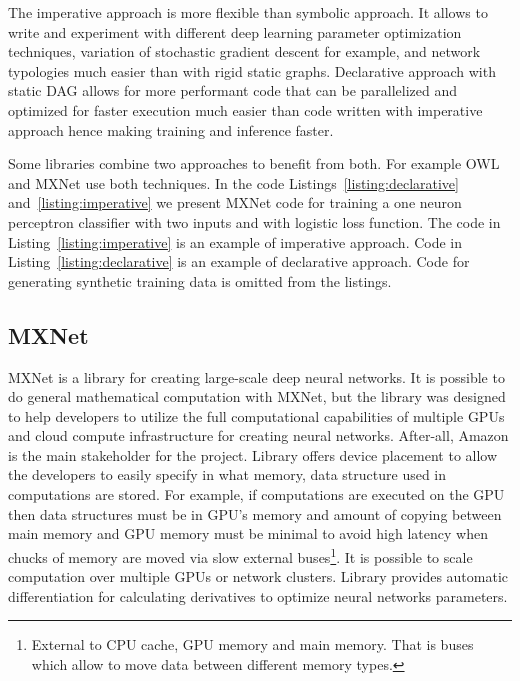 \documentclass[english, 12pt, a4paper, elec, utf8, online]{aaltothesis}
\begin{document}
The imperative approach is more flexible than symbolic approach. It allows to write and experiment with different deep learning parameter optimization techniques, variation of stochastic gradient descent for example, and network typologies much easier than with rigid static graphs. Declarative approach with static DAG allows for more performant code that can be parallelized and optimized for faster execution much easier than code written with imperative approach hence making training and inference faster. 

Some libraries combine two approaches to benefit from both. For example OWL and MXNet use both techniques. In the code Listings~\ref{listing:declarative} and~\ref{listing:imperative}  we present MXNet code for training a one neuron perceptron classifier with two inputs and with logistic loss function. The code  in Listing~\ref{listing:imperative} is an example of imperative approach. Code in Listing~\ref{listing:declarative} is an example of declarative approach. Code for generating synthetic training data is omitted from the listings.





\subsection{MXNet}
MXNet is a library for creating large-scale deep neural networks. It is possible to do general mathematical computation with MXNet, but the library was designed to help developers to utilize the full computational capabilities of multiple GPUs and cloud compute infrastructure for creating neural networks. After-all, Amazon is the main stakeholder for the project. Library offers device placement to allow the developers to easily specify in what memory, data structure used in computations are stored. For example, if computations are executed on the GPU then data structures must be in GPU’s memory and amount of copying between main memory and GPU memory must be minimal to avoid high latency when chucks of memory are moved via slow external buses\footnote{External to CPU cache, GPU memory and main memory. That is buses which allow to move data between different memory types.}.  It is possible to scale computation over multiple GPUs or network clusters. Library provides automatic differentiation for calculating derivatives to optimize neural networks parameters.
\end{document}
